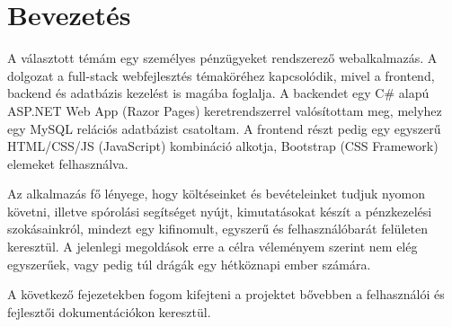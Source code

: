 \chapter{Bevezetés}
\label{ch:intro}

A választott témám egy személyes pénzügyeket rendszerező webalkalmazás. A dolgozat a full-stack webfejlesztés témaköréhez kapcsolódik, mivel a frontend, backend és adatbázis kezelést is magába foglalja. A backendet egy C\# alapú ASP.NET Web App (Razor Pages) keretrendszerrel valósítottam meg, melyhez egy MySQL relációs adatbázist csatoltam. A frontend részt pedig egy egyszerű HTML/CSS/JS (JavaScript) kombináció alkotja, Bootstrap (CSS Framework) elemeket felhasználva.

Az alkalmazás fő lényege, hogy költéseinket és bevételeinket tudjuk nyomon követni, illetve spórolási segítséget nyújt, kimutatásokat készít a pénzkezelési szokásainkról, mindezt egy kifinomult, egyszerű és felhasználóbarát felületen keresztül. A jelenlegi megoldások erre a célra véleményem szerint nem elég egyszerűek, vagy pedig túl drágák egy hétköznapi ember számára.

A következő fejezetekben fogom kifejteni a projektet bővebben a felhasználói és fejlesztői dokumentációkon keresztül.
